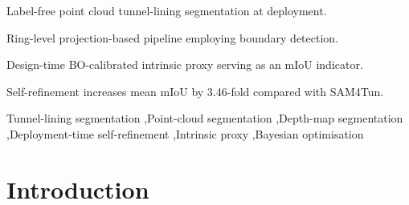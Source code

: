 \documentclass[a4paper,fleqn]{cas-dc}
\begin{document}
{%

\begin{highlights}
\item Label-free point cloud tunnel-lining segmentation at deployment.
\item Ring-level projection-based pipeline employing boundary detection.
\item Design-time BO-calibrated intrinsic proxy serving as an mIoU indicator.
\item Self-refinement increases mean mIoU by 3.46-fold compared with SAM4Tun.
\end{highlights}


\begin{keywords}
Tunnel-lining segmentation \sep Point-cloud segmentation \sep Depth-map segmentation \sep Deployment-time self-refinement \sep Intrinsic proxy \sep Bayesian optimisation
\end{keywords}

\maketitle

\smallskip

\section{Introduction}\label{sec:intro}
\begin{figure}[t]
\centering

\begin{subfigure}{0.98\textwidth}
\centering
{}
\end{subfigure}
\end{figure}}
\end{document}
